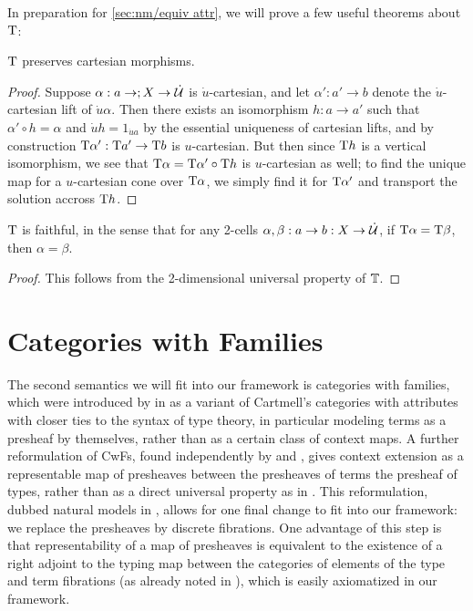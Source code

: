 \documentclass[../thesis.tex]{subfiles}
\begin{document}
In preparation for \cref{sec:nm/equiv attr}, we will prove a few useful theorems about ${{\mathrm{T}}}$:
\begin{lemma}\label{lem:comp typ preserves cartesian}
  ${{\mathrm{T}}}$ preserves cartesian morphisms.
\end{lemma}
\begin{proof}
  Suppose $\alpha : a \to  ; X \to \dot{{\mathcal{U}}}$ is $\dot u$-cartesian, and let $\alpha' : a' \to b$ denote the $\dot u$-cartesian
  lift of $\dot u\alpha$. Then there exists an isomorphism $h : a \to a'$ such that $\alpha' \circ h = \alpha$ and $\dot u h =
  1_{\dot u a}$ by the essential
  uniqueness of cartesian lifts, and by construction ${{\mathrm{T}}}\alpha' : {{\mathrm{T}}} a' \to {{\mathrm{T}}} b$ is $u$-cartesian. But then since ${{\mathrm{T}}}
  h$ is a vertical isomorphism, we see that ${{\mathrm{T}}} \alpha = {{\mathrm{T}}} \alpha' \circ {{\mathrm{T}}} h$ is $u$-cartesian as well; to find the
  unique map for a $u$-cartesian cone over ${{\mathrm{T}}}\alpha$, we simply find it for ${{\mathrm{T}}}\alpha'$ and transport the solution accross
  ${{\mathrm{T}}} h$.
\end{proof}

\begin{lemma}\label{lem:comp typ fully faithful}
  ${{\mathrm{T}}}$ is faithful, in the sense that for any 2-cells $\alpha,\beta : a \to b : X \to \dot{{\mathcal{U}}}$, if ${{\mathrm{T}}}\alpha = {{\mathrm{T}}}\beta$,
  then $\alpha = \beta$.
\end{lemma}
\begin{proof}
  This follows from the 2-dimensional universal property of ${\mathbb{T}}$. 
\end{proof}


\section{Categories with Families}\label{sec:nm}
The second semantics we will fit into our framework is categories with families, which were introduced by
\citeauthor{dybjer1996} in \cite{dybjer1996} as a variant of Cartmell's categories with attributes with
closer ties to the syntax of type theory, in particular modeling terms as a presheaf by themselves, rather
than as a certain class of context maps. A further reformulation of CwFs, found independently by \citeauthor{
fiore2012} \cite{fiore2012} and \citeauthor{awodey2017} \cite{awodey2017}, gives context extension as a
representable map of presheaves between the presheaves of terms the presheaf of types, rather than as a
direct universal property as in \cite{dybjer1996}.  This reformulation, dubbed natural models in \cite{
awodey2017}, allows for one final change to fit into our framework: we replace the presheaves by discrete
fibrations. One advantage of this step is that representability of a map of presheaves is equivalent to the
existence of a right adjoint to the typing map between the categories of elements of the type and term
fibrations (as already noted in \cite{awodey2017}), which is easily axiomatized in our framework.
\end{document}
